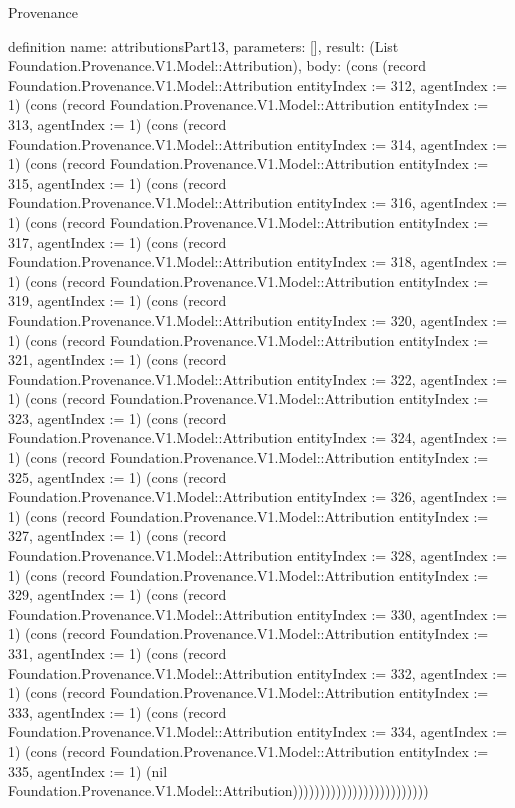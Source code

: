 \begin{lexlean}{Provenance}
\begin{semanticmodule}
definition{
  name: attributionsPart13,
  parameters: [],
  result: (List Foundation.Provenance.V1.Model::Attribution),
  body: (cons (record Foundation.Provenance.V1.Model::Attribution {entityIndex := 312, agentIndex := 1}) (cons (record Foundation.Provenance.V1.Model::Attribution {entityIndex := 313, agentIndex := 1}) (cons (record Foundation.Provenance.V1.Model::Attribution {entityIndex := 314, agentIndex := 1}) (cons (record Foundation.Provenance.V1.Model::Attribution {entityIndex := 315, agentIndex := 1}) (cons (record Foundation.Provenance.V1.Model::Attribution {entityIndex := 316, agentIndex := 1}) (cons (record Foundation.Provenance.V1.Model::Attribution {entityIndex := 317, agentIndex := 1}) (cons (record Foundation.Provenance.V1.Model::Attribution {entityIndex := 318, agentIndex := 1}) (cons (record Foundation.Provenance.V1.Model::Attribution {entityIndex := 319, agentIndex := 1}) (cons (record Foundation.Provenance.V1.Model::Attribution {entityIndex := 320, agentIndex := 1}) (cons (record Foundation.Provenance.V1.Model::Attribution {entityIndex := 321, agentIndex := 1}) (cons (record Foundation.Provenance.V1.Model::Attribution {entityIndex := 322, agentIndex := 1}) (cons (record Foundation.Provenance.V1.Model::Attribution {entityIndex := 323, agentIndex := 1}) (cons (record Foundation.Provenance.V1.Model::Attribution {entityIndex := 324, agentIndex := 1}) (cons (record Foundation.Provenance.V1.Model::Attribution {entityIndex := 325, agentIndex := 1}) (cons (record Foundation.Provenance.V1.Model::Attribution {entityIndex := 326, agentIndex := 1}) (cons (record Foundation.Provenance.V1.Model::Attribution {entityIndex := 327, agentIndex := 1}) (cons (record Foundation.Provenance.V1.Model::Attribution {entityIndex := 328, agentIndex := 1}) (cons (record Foundation.Provenance.V1.Model::Attribution {entityIndex := 329, agentIndex := 1}) (cons (record Foundation.Provenance.V1.Model::Attribution {entityIndex := 330, agentIndex := 1}) (cons (record Foundation.Provenance.V1.Model::Attribution {entityIndex := 331, agentIndex := 1}) (cons (record Foundation.Provenance.V1.Model::Attribution {entityIndex := 332, agentIndex := 1}) (cons (record Foundation.Provenance.V1.Model::Attribution {entityIndex := 333, agentIndex := 1}) (cons (record Foundation.Provenance.V1.Model::Attribution {entityIndex := 334, agentIndex := 1}) (cons (record Foundation.Provenance.V1.Model::Attribution {entityIndex := 335, agentIndex := 1}) (nil Foundation.Provenance.V1.Model::Attribution)))))))))))))))))))))))))
}


\end{semanticmodule}
\end{lexlean}
